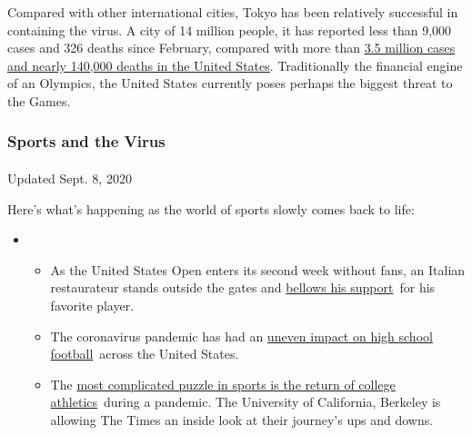 Compared with other international cities, Tokyo has been relatively
successful in containing the virus. A city of 14 million people, it has
reported less than 9,000 cases and 326 deaths since February, compared
with more than
\href{https://www.nytimes3xbfgragh.onion/2020/07/16/world/coronavirus-updates.html?action=click\&module=Top\%20Stories\&pgtype=Homepage}{3.5
million cases and nearly 140,000 deaths in the United States}.
Traditionally the financial engine of an Olympics, the United States
currently poses perhaps the biggest threat to the Games.

\hypertarget{sports-and-the-virus}{%
\subsubsection{Sports and the Virus}\label{sports-and-the-virus}}

\paragraph{}

Updated Sept. 8, 2020

Here's what's happening as the world of sports slowly comes back to
life:

\begin{itemize}
\item
  \begin{itemize}
  \tightlist
  \item
    As the United States Open enters its second week without fans, an
    Italian restaurateur stands outside the gates and
    \href{https://www.nytimes3xbfgragh.onion/2020/09/06/sports/tennis/US-Open-Matteo-Berrettini-fan.html?action=click\&pgtype=Article\&state=default\&region=MAIN_CONTENT_2\&context=storylines_keepup}{bellows
    his support}~for his favorite player.
  \item
    The coronavirus pandemic has had an
    \href{https://www.nytimes3xbfgragh.onion/2020/09/03/sports/ncaafootball/high-school-football-coronavirus-pandemic.html?action=click\&pgtype=Article\&state=default\&region=MAIN_CONTENT_2\&context=storylines_keepup}{uneven
    impact on high school football}~across the United States.
  \item
    The
    \href{https://www.nytimes3xbfgragh.onion/2020/09/02/sports/ncaafootball/coronavirus-cal-athletics-season.html?action=click\&pgtype=Article\&state=default\&region=MAIN_CONTENT_2\&context=storylines_keepup}{most
    complicated puzzle in sports is the return of college
    athletics}~during a pandemic. The University of California, Berkeley
    is allowing The Times an inside look at their journey's ups and
    downs.
  \end{itemize}
\end{itemize}

